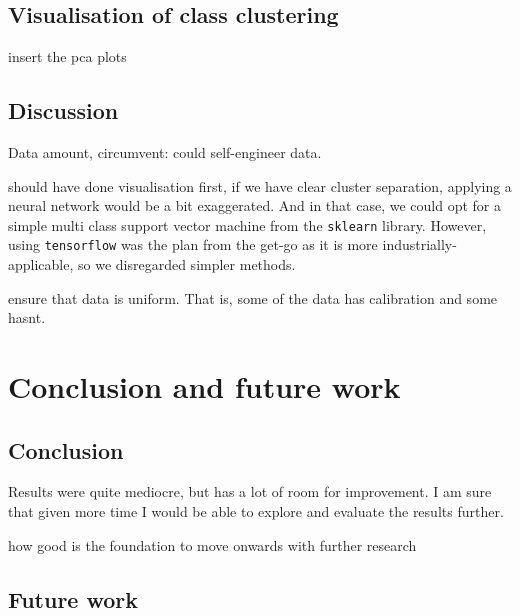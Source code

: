 \section{Visualisation of class clustering}
insert the pca plots

\section{Discussion}
Data amount, circumvent: could self-engineer data. 

should have done visualisation first, if we have clear cluster separation, applying a neural network would be a bit exaggerated. And in that case, we could opt for a simple multi class support vector machine from the \verb|sklearn| library. However, using \verb|tensorflow| was the plan from the get-go as it is more industrially-applicable, so we disregarded simpler methods.

ensure that data is uniform. That is, some of the data has calibration and some hasnt. 





\chapter{Conclusion and future work}

\section{Conclusion}
Results were quite mediocre, but has a lot of room for improvement. I am sure that given more time I would be able to explore and evaluate the results further.

how good is the foundation to move onwards with further research
\section{Future work}

